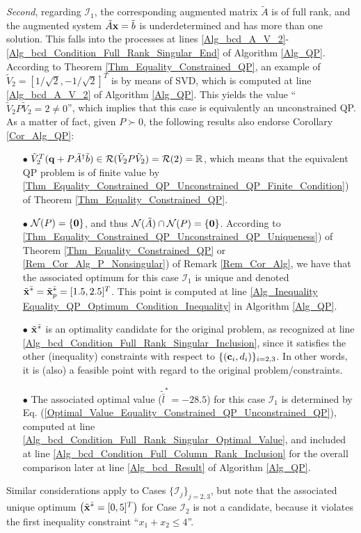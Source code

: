 \documentclass{imaman}
\newcommand{\bfc}{{\bf c}}
\newcommand{\bfx}{{\bf x}}
\newcommand{\bfq}{{\bf q}}
\newcommand{\bfzero}{{\bf 0}}
\newcommand{\real}{\mathbb{R}}
\newcommand{\calI}{{\mathcal I}}
\newcommand{\calN}{{\mathcal N}}
\newcommand{\calR}{{\mathcal R}}
\numberwithin{equation}{section}
\begin{document}
\begin{example}
\textit{Second}, regarding $\calI_1$, the corresponding augmented matrix $\tilde A$ is of full rank, and the augmented system $\tilde A\bfx=\tilde b$ is underdetermined and has more than one solution. This falls into the processes at lines \ref{Alg_bcd_A_V_2}-\ref{Alg_bcd_Condition_Full_Rank_Singular_End} of Algorithm \ref{Alg_QP}. According to Theorem \ref{Thm_Equality_Constrained_QP}, an example of $\tilde V_2=[1/\sqrt{2},-1/\sqrt{2}]^T$ is by means of SVD, which is computed at line \ref{Alg_bcd_A_V_2} of Algorithm \ref{Alg_QP}. This yields the value ``$\tilde V_2P\tilde V_2=2\ne 0$'', which implies that this case is equivalently an unconstrained QP. As a matter of fact, given $P\succ 0$, the following results also endorse Corollary \ref{Cor_Alg_QP}:
\begin{enumerate}
\item[$\bullet$] $\tilde V_2^T(\bfq+P\tilde A^\dagger\tilde b)\in\calR(\tilde V_2 P\tilde V_2)=\calR(2)=\real$, which means that the equivalent QP problem is of finite value by \ref{Thm_Equality_Constrained_QP_Unconstrained_QP_Finite_Condition}) of Theorem \ref{Thm_Equality_Constrained_QP}.
\item[$\bullet$] $\calN(P)=\{\bfzero\}$, and thus $\calN(\tilde A)\cap\calN(P)=\{\bfzero\}$. According to \ref{Thm_Equality_Constrained_QP_Unconstrained_QP_Uniqueness}) of Theorem \ref{Thm_Equality_Constrained_QP} or \ref{Rem_Cor_Alg_P_Nonsingular}) of Remark \ref{Rem_Cor_Alg}, we have that the associated optimum for this case $\calI_1$ is unique and denoted $\tilde\bfx^{\bar *}=\tilde\bfx_p^{\bar *}=[1.5,2.5]^T$. This point is computed at line \ref{Alg_Inequality Equality_QP_Optimum_Condition_Inequality} in Algorithm \ref{Alg_QP}.
\item[$\bullet$] $\tilde\bfx^{\bar *}$ is an optimality candidate for the original problem, as recognized at line \ref{Alg_bcd_Condition_Full_Rank_Singular_Inclusion}, since it satisfies the other (inequality) constraints with respect to $\{(\bfc_i,d_i)\}_{i=2,3}$. In other words, it is (also) a feasible point with regard to the original problem/constraints.
\item[$\bullet$] The associated optimal value ($\tilde{\bar l}^*=-28.5$) for this case $\calI_1$ is determined by Eq. (\ref{Optimal_Value_Equality_Constrained_QP_Unconstrained_QP}), computed at line \ref{Alg_bcd_Condition_Full_Rank_Singular_Optimal_Value}, and included at line \ref{Alg_bcd_Condition_Full_Column_Rank_Inclusion} for the overall comparison later at line \ref{Alg_bcd_Result} of Algorithm \ref{Alg_QP}.
\end{enumerate}
Similar considerations apply to Cases $\{\calI_j\}_{j=2,3}$, but note that the associated unique optimum $\left(\tilde\bfx^{\bar *}=[0,5]^T\right)$ for Case $\calI_2$ is not a candidate, because it violates the first inequality constraint ``$x_1+x_2\le 4$''.


\end{example}
\end{document}
